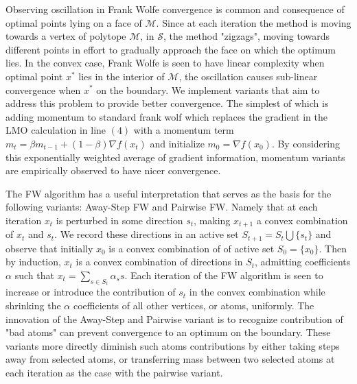 \documentclass{article}
\begin{document}
Observing oscillation in Frank Wolfe convergence is common and consequence of optimal points lying on a face of $\mathcal{M}$. Since at each iteration the method is moving towards a vertex of polytope $\mathcal{M}$, in $\mathcal{S}$, the method "zigzags", moving towards different points in effort to gradually approach the face on which the optimum lies. In the convex case, Frank Wolfe is seen to have linear complexity when optimal point $x^*$ lies in the interior of $\mathcal{M}$, the oscillation causes sub-linear convergence when $x^*$ on the boundary.
 We implement variants that aim to address this problem to provide better convergence. The simplest of which is adding momentum to standard frank wolf which replaces the gradient in the LMO calculation in line $(4)$ with a momentum term $m_t  = \beta m_{t-1} + (1-\beta) \nabla f(x_t)$ and initialize $m_0 = \nabla f(x_0)$. By considering this exponentially weighted average of gradient information, momentum variants are empirically observed to have nicer convergence. 

The FW algorithm has a useful interpretation that serves as the basis for the following variants: Away-Step FW and Pairwise FW. Namely that at each iteration $x_t$ is perturbed in some direction $s_t$, making $x_{t+1}$ a convex combination of $x_t$ and $s_t$. We record these directions in an active set $S_{t+1} = S_t \bigcup \{s_t\}$ and observe that initially $x_0$ is a convex combination of of active set $S_0 = \{x_0\}$. Then by induction, $x_t$ is a convex combination of directions in $S_t$, admitting coefficients $\alpha$ such that $x_t = \sum_{s \in S_t} \alpha_{s} s$.
Each iteration of the FW algorithm is seen to increase or introduce the contribution of $s_t$ in the convex combination while shrinking the $\alpha$ coefficients of all other vertices, or atoms, uniformly.
The innovation of the Away-Step and Pairwise variant is to recognize contribution of "bad atoms" can prevent convergence to an optimum on the boundary. These variants more directly diminish such atoms contributions by either taking steps away from selected atoms, or transferring mass between two selected atoms at each iteration as the case with the pairwise variant.
\end{document}
